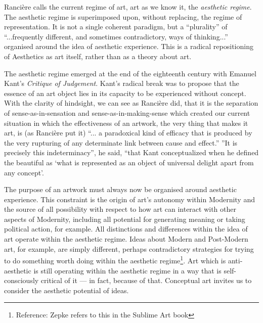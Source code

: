 \documentclass[letterpaper]{article}
\begin{document}
    Rancière calls the current regime of art, art as we know it, the \emph{aesthetic regime}. The aesthetic regime is superimposed upon, without replacing, the regime of representation. It is not a single coherent paradigm, but a “plurality” of “...frequently different, and sometimes contradictory, ways of thinking...” \citep[p.8]{RanciereMdrnTms2022} organised around the idea of aesthetic experience. This is a radical repositioning of Aesthetics as art itself, rather than as a theory about art.
    
    The aesthetic regime emerged at the end of the eighteenth century with Emanuel Kant's \emph{Critique of Judgement}. Kant's radical break was to propose that the essence of an art object lies in its capacity to be experienced without concept. With the clarity of hindsight, we can see as Rancière did, that it is the separation of sense-as-in-sensation and sense-as-in-making-sense which created our current situation in which the effectiveness of an artwork, the very thing that makes it art, is (as Rancière put it) “... a paradoxical kind of efficacy that is produced by the very rupturing of any determinate link between cause and effect.” \citep[p.51]{RancierThEmncptdSpcttr2009} ”It is precisely this indeterminacy”, he said, “that Kant conceptualized when he defined the beautiful as ‘what is represented as an object of universal delight apart from any concept’. \citep[p.52]{RancierThEmncptdSpcttr2009}

    The purpose of an artwork must always now be organised around aesthetic experience. This constraint is the origin of art's autonomy within Modernity and the source of all possibility with respect to how art can interact with other aspects of Modernity, including all potential for generating meaning or taking political action, for example. All distinctions and differences within the idea of art operate within the aesthetic regime. Ideas about Modern and Post-Modern art, for example, are simply different, perhaps contradictory strategies for trying to do something worth doing within the aesthetic regime\footnote{Reference: Zepke refers to this in the Sublime Art book}. Art which is anti-aesthetic is still operating within the aesthetic regime in a way that is self-consciously critical of it — in fact, because of that. Conceptual art invites us to consider the aesthetic potential of ideas.
\end{document}
